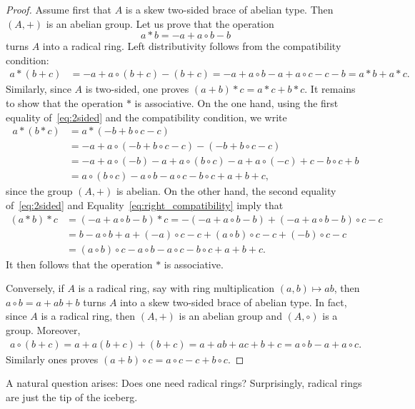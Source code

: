 \begin{proof}
    Assume first that $A$ is a skew two-sided brace of abelian type. Then $(A,+)$ is an abelian group. 
    Let us prove that the operation
    \[
    a*b=-a+a\circ b-b
    \]
    turns $A$ into a radical ring. Left distributivity follows from the compatibility condition:
    \begin{align*}
    a*(b+c)&=-a+a\circ (b+c)-(b+c)
    =-a+a\circ b-a+a\circ c-c-b=a*b+a*c.
    \end{align*}
    Similarly, since $A$ is two-sided, one proves $(a+b)*c=a*c+b*c$. It remains to show that the operation $*$
    is associative. On the one hand, using the first equality of~\eqref{eq:2sided} 
    and the compatibility condition, we write
    \begin{align*}
    a*(b*c)&=a*(-b+b\circ c-c)\\
    &=-a+a\circ(-b+b\circ c-c)-(-b+b\circ c-c)\\
    &=-a+a\circ (-b)-a+a\circ(b\circ c)-a+a\circ (-c)+c-b\circ c+b\\
    &=a\circ (b\circ c)-a\circ b-a\circ c-b\circ c+a+b+c,
    \end{align*}
    since the group $(A,+)$ is abelian. On the other hand, the second equality of~\eqref{eq:2sided} and
    Equality~\eqref{eq:right_compatibility} imply that
    \begin{align*}
    (a*b)*c &= (-a+a\circ b-b)*c=-(-a+a\circ b-b)+(-a+a\circ b-b)\circ c-c\\
    &=b-a\circ b+a+(-a)\circ c-c+(a\circ b)\circ c-c+(-b)\circ c-c\\
    &=(a\circ b)\circ c-a\circ b-a\circ c-b\circ c+a+b+c.
    \end{align*}
    It then follows that the operation $*$ is associative. 
    
    Conversely, if $A$ is a radical ring, say with ring multiplication $(a,b)\mapsto ab$, 
    then $a\circ b=a+ab+b$ turns $A$ into a skew two-sided brace 
    of abelian type. In fact, since $A$ is a radical ring, then 
    $(A,+)$ is an abelian group and $(A,\circ)$ is a group. Moreover, 
    \begin{align*}
        a\circ (b+c)=a+a(b+c)+(b+c)=a+ab+ac+b+c=a\circ b-a+a\circ c.
    \end{align*}
    Similarly ones proves $(a+b)\circ c=a\circ c-c+b\circ c$.
\end{proof}

A natural question arises: Does one need radical rings? Surprisingly, 
radical rings are just the tip of the iceberg. 

